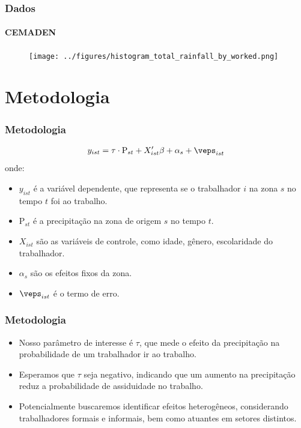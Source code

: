 \begin{frame}[plain]
    \frametitle{Dados}
    \framesubtitle{CEMADEN}
    \begin{figure}[H]
        \centering
        \texttt{[image: ../figures/histogram\_total\_rainfall\_by\_worked.png]}
        \label{fig:hist_total_rainfall_by_worked}
    \end{figure} 
\end{frame}


\section{Metodologia}
\begin{frame}[plain]
    \frametitle{Metodologia}
    \begin{align*}
    y_{ist} &= \tau \cdot \text{P}_{st} + X_{ist}'\beta + \alpha_{s} + \veps_{ist} \\ 
    \end{align*}
    onde:
    \begin{itemize}
        \item $y_{ist}$ é a variável dependente, que representa se o trabalhador $i$ na zona $s$ no tempo $t$ foi ao trabalho.
        \item $\text{P}_{st}$ é a precipitação na zona de origem $s$ no tempo $t$.
        \item $X_{ist}$ são as variáveis de controle, como idade, gênero, escolaridade do trabalhador.
        \item $\alpha_{s}$ são os efeitos fixos da zona.
        \item $\veps_{ist}$ é o termo de erro.
    \end{itemize}
\end{frame}

\begin{frame}
    \frametitle{Metodologia}
    \begin{itemize}
        \item Nosso parâmetro de interesse é $\tau$, que mede o efeito da precipitação na probabilidade de um trabalhador ir ao trabalho.
        \item Esperamos que $\tau$ seja negativo, indicando que um aumento na precipitação reduz a probabilidade de assiduidade no trabalho.
        \item Potencialmente buscaremos identificar efeitos heterogêneos, considerando trabalhadores formais e informais, bem como atuantes em setores distintos.
    \end{itemize}
\end{frame}

